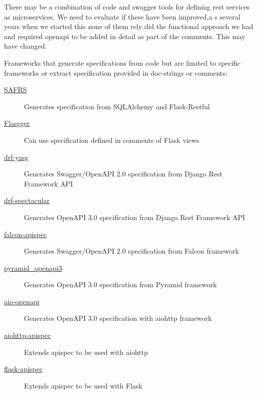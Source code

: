 \documentclass[conference]{IEEEtran}
\begin{document}
There may be a combination of code and swagger tools for defining rest services as microservices. We need to evaluate if these have been improved,a s several years when we started this none of them rely did the functional approach we had and required openapi to be added in detail as part of the comments. This may have changed.

Frameworks that generate specifications from code but are limited to specific frameworks or extract specification provided in doc-strings or comments:

\begin{description}

\item[\href{https://github.com/thomaxxl/safrs}{SAFRS}] Generates specification from SQLAlchemy and Flask-Restful \cite{www-safrs}

\item[\href{https://github.com/flasgger/flasgger}{Flasgger}] Can use specification defined in comments of Flask views  \cite{www-flasgger}

\item[\href{https://github.com/axnsan12/drf-yasg}{drf-yasg}] Generates Swagger/OpenAPI 2.0 specification from Django Rest Framework API \cite{www-drf-yasg}

\item[\href{https://github.com/tfranzel/drf-spectacular}{drf-spectacular}] Generates OpenAPI 3.0 specification from Django Rest Framework API \cite{www-drf-spectacular}

\item[\href{https://github.com/alysivji/falcon-apispec}{falcon-apispec}] Generates Swagger/OpenAPI 2.0 specification from Falcon framework \cite{www-falcon-apispec}

\item[\href{https://github.com/Pylons/pyramid_openapi3}{pyramid\_openapi3}] Generates OpenAPI 3.0 specification from Pyramid framework \cite{www-pyramid-openapi3}

\item[\href{https://github.com/quantmind/aio-openapi}{aio-openapi}] Generates OpenAPI 3.0 specification with aiohttp framework \cite{www-aio-openapi}

\item[\href{https://github.com/maximdanilchenko/aiohttp-apispec}{aiohttp-apispec}] Extends apispec to be used with aiohttp \cite{www-aiohttp-apispec}

\item[\href{https://github.com/jmcarp/flask-apispec}{flask-apispec}] Extends apispec to be used with Flask \cite{www-flask-apispec}

\end{description}
\end{document}
